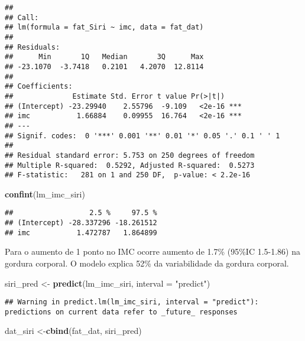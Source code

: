 \documentclass[]{article}
\newenvironment{Shaded}{\begin{snugshade}}{\end{snugshade}}
\newcommand{\DataTypeTok}[1]{\textcolor[rgb]{0.13,0.29,0.53}{#1}}
\newcommand{\KeywordTok}[1]{\textcolor[rgb]{0.13,0.29,0.53}{\textbf{#1}}}
\newcommand{\NormalTok}[1]{#1}
\newcommand{\StringTok}[1]{\textcolor[rgb]{0.31,0.60,0.02}{#1}}
\begin{document}
\begin{verbatim}
## 
## Call:
## lm(formula = fat_Siri ~ imc, data = fat_dat)
## 
## Residuals:
##      Min       1Q   Median       3Q      Max 
## -23.1070  -3.7418   0.2101   4.2070  12.8114 
## 
## Coefficients:
##              Estimate Std. Error t value Pr(>|t|)    
## (Intercept) -23.29940    2.55796  -9.109   <2e-16 ***
## imc           1.66884    0.09955  16.764   <2e-16 ***
## ---
## Signif. codes:  0 '***' 0.001 '**' 0.01 '*' 0.05 '.' 0.1 ' ' 1
## 
## Residual standard error: 5.753 on 250 degrees of freedom
## Multiple R-squared:  0.5292, Adjusted R-squared:  0.5273 
## F-statistic:   281 on 1 and 250 DF,  p-value: < 2.2e-16
\end{verbatim}

\begin{Shaded}
\begin{Highlighting}[]
\KeywordTok{confint}\NormalTok{(lm_imc_siri)}
\end{Highlighting}
\end{Shaded}

\begin{verbatim}
##                  2.5 %     97.5 %
## (Intercept) -28.337296 -18.261512
## imc           1.472787   1.864899
\end{verbatim}

Para o aumento de 1 ponto no IMC ocorre aumento de 1.7\% (95\%IC
1.5-1.86) na gordura corporal. O modelo explica 52\% da variabilidade da
gordura corporal.

\begin{Shaded}
\begin{Highlighting}[]
\NormalTok{siri_pred <-}\StringTok{ }\KeywordTok{predict}\NormalTok{(lm_imc_siri, }\DataTypeTok{interval =} \StringTok{"predict"}\NormalTok{)}
\end{Highlighting}
\end{Shaded}

\begin{verbatim}
## Warning in predict.lm(lm_imc_siri, interval = "predict"): predictions on current data refer to _future_ responses
\end{verbatim}

\begin{Shaded}
\begin{Highlighting}[]
\NormalTok{dat_siri <-}\KeywordTok{cbind}\NormalTok{(fat_dat, siri_pred)}
\end{Highlighting}
\end{Shaded}
\end{document}
